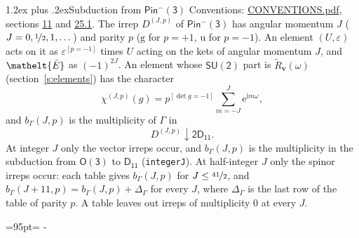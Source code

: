 \documentclass[10pt,a4paper]{article}
\makeatletter
\renewcommand\section{\@startsection{section}{1}{\z@}{-3ex plus -1ex minus -.2ex}%
  {1.2ex plus .2ex}{\normalfont\large\sffamily\bfseries\color{parttitle}}}
\newcommand{\needspace}[1]{\par\penalty-100\begingroup\dimen0=#1\relax\dimen2=\pagegoal
  \advance\dimen2-\pagetotal\ifdim\dimen0>\dimen2\relax\ifdim\dimen2>0pt\vfil\break\fi\fi
  \endgroup}
\numberwithin{equation}{section}
\newcommand{\eltfont}[1]{{\let\sigma\eltsigma\mathelt{#1}}}
\newcommand{\grp}[1]{\mathsf{#1}}
\newcommand{\elt}[1]{\eltfont{#1}}
\newcommand{\ptag}[1]{\mathrm{#1}}
\newcommand{\iverson}[1]{[#1]}
\newcommand{\restr}[2]{#1\!\downarrow#2}
\newcommand{\vv}{\mathbf{v}}
\newcommand{\iunit}{\mathrm{i}}
\newcommand{\expe}{\mathrm{e}}
\newcommand{\irrJp}[2]{D^{(#1,#2)}}
\newcommand{\barred}[1]{\bar{#1}}
\newcommand{\lift}[1]{\tilde{#1}}
\makeatother
\begin{document}
\section{Subduction from \texorpdfstring{$\grp{Pin^{-}(3)}$}{Pin(3)}}\label{s:subduction_parent}
Conventions: \href{../../CONVENTIONS.pdf}{CONVENTIONS.pdf}, sections \href{../../../rotation/CONVENTIONS.pdf\#conv.11}{11} and \href{../../CONVENTIONS.pdf\#conv.25.1}{25.1}.
\leavevmode\label{n:index.J}\label{n:index.parity}\label{n:irrep.o3}The irrep $\irrJp{J}{p}$ of \href{Pinminus3.pdf}{$\grp{Pin^{-}(3)}$} has angular momentum $J$ ($J = 0, \nicefrac{1}{2}, 1, \dots$) and parity $p$ ($\ptag{g}$ for $p = +1$, $\ptag{u}$ for $p = -1$). An element $(U, \varepsilon)$ acts on it as $\varepsilon^{[p = -1]}$ times $U$ acting on the kets of angular momentum $J$, and $\elt{\barred{E}}$ as $(-1)^{2J}$. \label{n:function.character.parent}\label{n:function.multiplicity}An element whose $\grp{SU(2)}$ part is $\lift{R}_{\vv}(\omega)$ (section~\ref{s:elements}) has the character
\begin{equation}\label{e:chi}\chi^{(J,p)}(g) = p^{\iverson{\det g = -1}}\sum_{m=-J}^{J} \expe^{\iunit m\omega},\end{equation}
and $b_\Gamma(J, p)$ is the multiplicity of $\Gamma$ in
\begin{equation}\label{e:parent}\restr{\irrJp{J}{p}}{\grp{2D_{11}}}.\end{equation}
At integer $J$ only the vector irreps occur, and $b_\Gamma(J, p)$ is the multiplicity in the subduction from $\grp{O(3)}$ to \href{../../../rotation/data/pdf/D11.pdf}{$\grp{D_{11}}$} (\texttt{integerJ}). \label{n:index.increment}At half-integer $J$ only the spinor irreps occur: each table gives $b_\Gamma(J, p)$ for $J \le \nicefrac{41}{2}$, and $b_\Gamma(J + 11, p) = b_\Gamma(J, p) + \Delta_\Gamma$ for every $J$, where $\Delta_\Gamma$ is the last row of the table of parity $p$. A table leaves out irreps of multiplicity 0 at every $J$.
\needspace{95pt}
\end{document}
